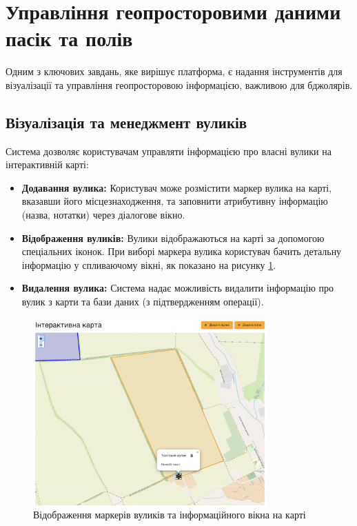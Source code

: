 
\section{Управління геопросторовими даними пасік та полів}
\label{sec:tasks_map}
Одним з ключових завдань, яке вирішує платформа, є надання інструментів для візуалізації та управління геопросторовою інформацією, важливою для бджолярів.

\subsection{Візуалізація та менеджмент вуликів}
\label{subsec:task_map_hives}
Система дозволяє користувачам управляти інформацією про власні вулики на інтерактивній карті:
\begin{itemize}
    \item \textbf{Додавання вулика:} Користувач може розмістити маркер вулика на карті, вказавши його місцезнаходження, та заповнити атрибутивну інформацію (назва, нотатки) через діалогове вікно.
    \item \textbf{Відображення вуликів:} Вулики відображаються на карті за допомогою спеціальних іконок. При виборі маркера вулика користувач бачить детальну інформацію у спливаючому вікні, як показано на рисунку \ref{fig:task_map_hives_demo}.
    \item \textbf{Видалення вулика:} Система надає можливість видалити інформацію про вулик з карти та бази даних (з підтвердженням операції).
\end{itemize}

\begin{figure}[htbp]
    \centering
    \includegraphics[width=0.8\textwidth]{practice_report/images/map_hives_demo.png}
    \caption{Відображення маркерів вуликів та інформаційного вікна на карті}
    \label{fig:task_map_hives_demo}
\end{figure}

